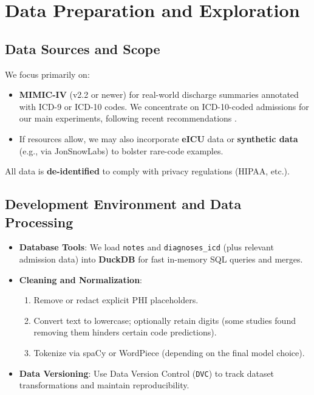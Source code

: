 \documentclass[12pt,a4paper]{report}
\begin{document}
\section{Data Preparation and Exploration}

\subsection{Data Sources and Scope}
We focus primarily on:
\begin{itemize}
    \item \textbf{MIMIC-IV} (v2.2 or newer) for real-world discharge summaries annotated with ICD-9 or ICD-10 codes. We concentrate on ICD-10-coded admissions for our main experiments, following recent recommendations \cite{edin2023automated}.
    \item If resources allow, we may also incorporate \textbf{eICU} data or \textbf{synthetic data} (e.g., via JonSnowLabs) to bolster rare-code examples.
\end{itemize}
All data is \textbf{de-identified} to comply with privacy regulations (HIPAA, etc.).

\subsection{Development Environment and Data Processing}
\begin{itemize}
    \item \textbf{Database Tools}: We load \texttt{notes} and \texttt{diagnoses\_icd} (plus relevant admission data) into \textbf{DuckDB} for fast in-memory SQL queries and merges.
    \item \textbf{Cleaning and Normalization}:
    \begin{enumerate}
        \item Remove or redact explicit PHI placeholders.
        \item Convert text to lowercase; optionally retain digits (some studies found removing them hinders certain code predictions).
        \item Tokenize via spaCy or WordPiece (depending on the final model choice).
    \end{enumerate}
    \item \textbf{Data Versioning}: Use Data Version Control (\texttt{DVC}) to track dataset transformations and maintain reproducibility.
\end{itemize}
\end{document}
